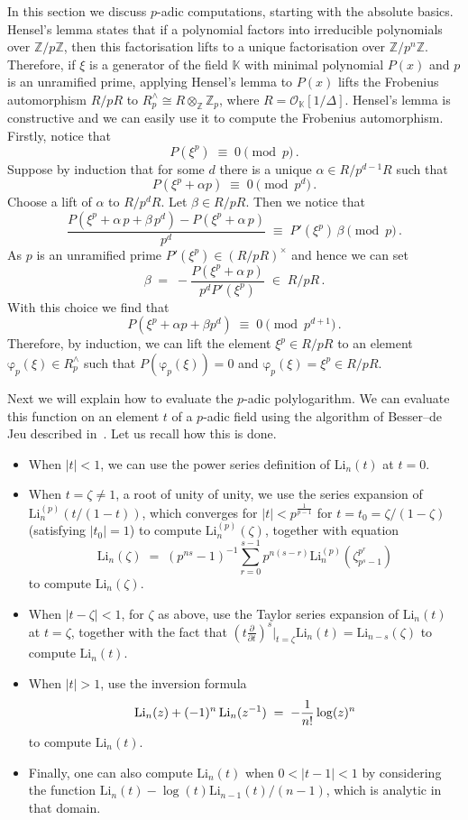 \documentclass[12pt,reqno]{amsart}
\theoremstyle{definition}
\def\BZ{\mathbb Z}
\def\BK{\mathbb K}
\def\Li{\mathrm{Li}}
\def\be{\begin{equation}}
\def\ee{\end{equation}}
\def\z{\zeta}
\def\calO{\mathcal{O}}
\def\={\;=\;}
\def\inn{\;\in\;}
\def\cm{\;\equiv\;}
\def\fr{\mathrm{\varphi}_p}
\begin{document}
In this section we discuss $p$-adic computations, starting with the absolute basics.
Hensel's lemma states that if a polynomial factors into irreducible polynomials over
$\BZ/p\BZ$, then this factorisation lifts to a unique factorisation over $\BZ/p^n\BZ$.
Therefore, if $\xi$ is a generator of the field $\BK$ with minimal polynomial $P(x)$
and $p$ is an unramified prime, applying Hensel's lemma to $P(x)$ lifts the Frobenius
automorphism $R/pR$ to $R_{p}^\wedge\cong R\otimes_{\BZ}\BZ_{p}$, where
$R=\calO_\BK[1/\Delta]$. Hensel's lemma is constructive and we can easily use it to
compute the Frobenius automorphism.
Firstly, notice that
\be
P(\xi^{p}) \cm 0\pmod{p}\,.
\ee
Suppose by induction that for some $d$ there is a unique $\alpha\in R/p^{d-1} R$
such that
\be
P(\xi^{p}+\alpha p) \cm 0\pmod{p^{d}}\,.
\ee
Choose a lift of $\alpha$ to $R/p^{d} R$. Let
$\beta\in R/p R$. Then we notice that
\be
\frac{P(\xi^{p}+\alpha\,p+\beta\,p^{d})-P(\xi^{p}+\alpha\,p)}{p^{d}}
\cm P'(\xi^{p})\,\beta\pmod{p}\,.
\ee
As $p$ is an unramified prime $P'(\xi^{p})\in( R/p R)^{\times}$ and hence we
can set
\be
\beta\=-\frac{P(\xi^{p}+\alpha\,p)}{p^{d}P'(\xi^{p})} \inn R/p R\,.
\ee
With this choice we find that
\be
P(\xi^{p}+\alpha p+\beta p^{d})\cm 0\pmod{p^{d+1}}\,.
\ee
Therefore, by induction, we can lift the element $\xi^{p}\in R/p R$ to an
element $\fr(\xi)\in R_{p}^\wedge$ such that $P(\fr(\xi))=0$ and
$\fr(\xi)=\xi^{p}\in R/p R$.

\medskip

Next we will explain how to evaluate the $p$-adic
polylogarithm. We can evaluate this function on an element $t$ of a $p$-adic field
using the algorithm of Besser--de Jeu described in~\cite{Lip}. Let us recall how
this is done.

\begin{itemize}
\item
  When $|t|<1$, we can use the power series definition of $\Li_n(t)$ at $t=0$.
\item
  When $t=\z \neq 1$, a root of unity of unity, we use the series expansion of
  $\Li^{(p)}_n(t/(1-t))$, which converges for $|t|< p^{\tfrac{1}{p-1}}$ for
  $t=t_0=\z/(1-\z)$ (satisfying $|t_0|=1$) to compute
  $\Li^{(p)}_n(\z)$, together with equation~\cite[Prop. 4.2]{Lip} 
\be
\Li_n(\z)
\=
(p^{ns}-1)^{-1}
\sum_{r=0}^{s-1}
p^{n(s-r)}\Li_n^{(p)}(\z_{p^{s}-1}^{p^{r}})
\ee
  to compute $\Li_n(\z)$.
\item
  When $|t-\z|<1$, for $\z$ as above, use the Taylor series expansion of $\Li_n(t)$
  at $t=\z$, together with the fact that
  $(t \tfrac{\partial}{\partial t})^s|_{t=\z} \Li_n(t)=\Li_{n-s}(\z)$ to compute
  $\Li_n(t)$. 
\item
  When $|t|>1$, use the inversion formula 
\be
\Li_n(z)+(-1)^{n}\thinspace\Li_n(z^{-1})
\=
-\frac{1}{n!}\log(z)^{n}
\ee
  to compute $\Li_n(t)$. 
\item
  Finally, one can also compute $\Li_n(t)$ when $0<|t-1|<1$ by considering the
  function $\Li_n(t)-\log(t)\Li_{n-1}(t)/(n-1)$, which is analytic in that domain.
\end{itemize}
\end{document}
